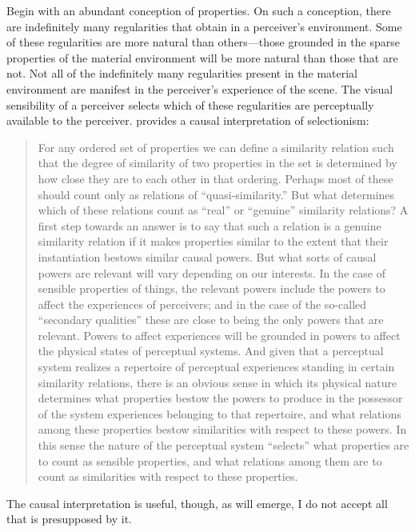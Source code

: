 \documentclass[12pt]{article}
\begin{document}
Begin with an abundant conception of properties. On such a conception, there are indefinitely many regularities that obtain in a perceiver's environment. Some of these regularities are more natural than others---those grounded in the sparse properties of the material environment will be more natural than those that are not. Not all of the indefinitely many regularities present in the material environment are manifest in the perceiver's experience of the scene. The visual sensibility of a perceiver selects which of these regularities are perceptually available to the perceiver. \citet{Shoemaker:wk} provides a causal interpretation of selectionism: 
\begin{quote}
	For any ordered set of properties we can define a similarity relation such that the degree of similarity of two properties in the set is determined by how close they are to each other in that ordering. Perhaps most of these should count only as relations of ``quasi-similarity.'' But what determines which of these relations count as ``real'' or ``genuine'' similarity relations? A first step towards an answer is to say that such a relation is a genuine similarity relation if it makes properties similar to the extent that their instantiation bestows similar causal powers. But what sorts of causal powers are relevant will vary depending on our interests. In the case of sensible properties of things, the relevant powers include the powers to affect the experiences of perceivers; and in the case of the so-called ``secondary qualities'' these are close to being the only powers that are relevant. Powers to affect experiences will be grounded in powers to affect the physical states of perceptual systems. And given that a perceptual system realizes a repertoire of perceptual experiences standing in certain similarity relations, there is an obvious sense in which its physical nature determines what properties bestow the powers to produce in the possessor of the system experiences belonging to that repertoire, and what relations among these properties bestow similarities with respect to these powers. In this sense the nature of the perceptual system ``selects'' what properties are to count as sensible properties, and what relations among them are to count as similarities with respect to these properties. 
\end{quote}
The causal interpretation is useful, though, as will emerge, I do not accept all that is presupposed by it.
\end{document}

